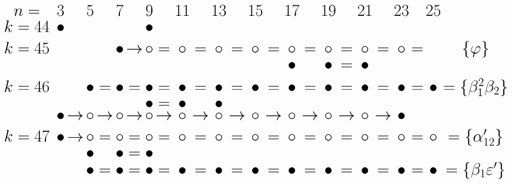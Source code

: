 \documentclass{article}
\begin{document}
\(
\begin{tikzcd}[
nodes={font=\huge,inner sep=0pt},
row sep=0.2cm,
column sep=0.1cm
]
n= && & 3 & & 5 & & 7 & & 9 & & 11 & & 13 & & 15 & & 17 && 19 && 21 && 23 && 25\\
k=44 &&& \bullet && && && \bullet &&  \\ \\
k=45 &&&&& && \bullet &\rightarrow& \circ &=& \circ &=& \circ &=& \circ &=& \circ &=& \circ &=& \circ &=& \circ &=& & \{\varphi\}  \\
& && && && && && && && && \bullet && \bullet &=& \bullet  \\ \\
k=46 &&& && \bullet &=& \bullet &=& \bullet &=& \bullet &=& \bullet  &=& \bullet  &=& \bullet  &=& \bullet &=& \bullet  &=& \bullet  &=& \bullet  & =\{\beta_1^2\beta_2\} \\
 &&& && && && \bullet &=& \bullet && \bullet && \\
&&& \bullet &\rightarrow& \circ &\rightarrow& \circ &\rightarrow& \circ &\rightarrow& \circ &\rightarrow& \circ &\rightarrow& \circ &\rightarrow& \circ &\rightarrow& \circ &\rightarrow& \circ &\rightarrow& \bullet \\ \\ 
k=47 &&& \bullet &\rightarrow& \circ &=& \circ &=& \circ &=& \circ &=& \circ &=& \circ &=& \circ &=& \circ &=& \circ &=& \circ &=& \circ& = \{\alpha'_{12}\} \\
&&& && \bullet && \bullet &=& \bullet && \\
&&& && \bullet &=& \bullet &=& \bullet &=& \bullet &=& \bullet  &=& \bullet  &=& \bullet  &=& \bullet &=& \bullet  &=& \bullet  &=& \bullet  & =\{\beta_1\varepsilon'\} \\
\\
\end{tikzcd}
\)
\end{document}
